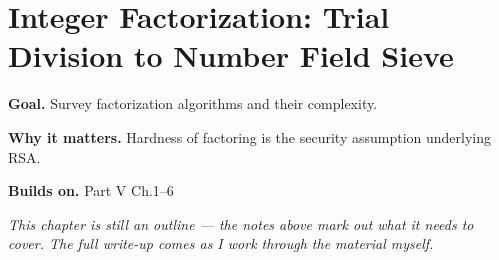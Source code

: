 \chapter{Integer Factorization: Trial Division to Number Field Sieve}
\label{ch:05-number-theory-07}

\begin{chapterintro}
\textbf{Goal.} Survey factorization algorithms and their complexity.

\textbf{Why it matters.} Hardness of factoring is the security assumption underlying RSA.

\textbf{Builds on.} Part V Ch.1–6
\end{chapterintro}

\textit{This chapter is still an outline --- the notes above mark out what it needs to cover. The full write-up comes as I work through the material myself.}
